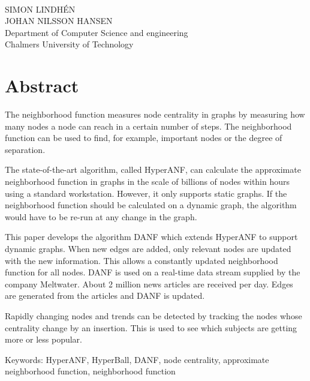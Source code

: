 \maintitle\\
\subtitle\\
SIMON LINDHÉN\\
JOHAN NILSSON HANSEN\\
Department of Computer Science and engineering\\
Chalmers University of Technology \setlength{\parskip}{0.5cm}

\thispagestyle{plain}			%
\setlength{\parskip}{0pt plus 1.0pt}
\setlength{\parindent}{15pt}
\section*{Abstract}
The neighborhood function measures node centrality in graphs by measuring how many nodes a node can reach in a certain number of steps. The neighborhood function can be used to find, for example, important nodes or the degree of separation. 

The state-of-the-art algorithm, called HyperANF, can calculate the approximate neighborhood function in graphs in the scale of billions of nodes within hours using a standard workstation\cite{hyperanf}. However, it only supports static graphs. If the neighborhood function should be calculated on a dynamic graph, the algorithm would have to be re-run at any change in the graph. 

This paper develops the algorithm DANF which extends HyperANF to support dynamic graphs. When new edges are added, only relevant nodes are updated with the new information. This allows a constantly updated neighborhood function for all nodes. DANF is used on a real-time data stream supplied by the company Meltwater. About 2 million news articles are received per day. Edges are generated from the articles and DANF is updated. 

Rapidly changing nodes and trends can be detected by tracking the nodes whose centrality change by an insertion. This is used to see which subjects are getting more or less popular. 

\vfill
\noindent Keywords: HyperANF, HyperBall, DANF, node centrality, approximate neighborhood function, neighborhood function

\newpage				%
\thispagestyle{empty}
\mbox{}